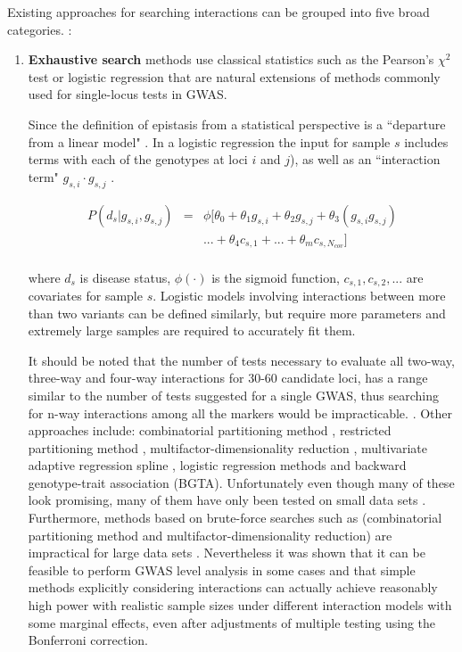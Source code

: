 Existing approaches for searching interactions can be grouped into five broad categories. \cite{li2011detecting}:
\begin{enumerate}
	\item \textbf{Exhaustive search} methods use classical statistics such as the Pearson's $\chi^2$ test or logistic regression that are natural extensions of methods commonly used for single-locus tests in GWAS.
	
Since the definition of epistasis from a statistical perspective is a ``departure from a linear model" \cite{cordell2009detecting}. 
In a logistic regression the input for sample $s$ includes terms with each of the genotypes at loci $i$ and $j$), as well as an ``interaction term" $g_{s,i} \cdot g_{s,j}$ \cite{cordell2002epistasis}. 

\begin{eqnarray*} \label{eq:gwasLogRegH1}
    P( d_s | g_{s,i},g_{s,j}) & = & \phi[ \theta_0 + \theta_1 g_{s,i} + \theta_2 g_{s,j} + \theta_3 (g_{s,i} g_{s,j}) \\
    & & ... + \theta_4 c_{s,1} + ... + \theta_m c_{s,N_{cov}} ] \\
\end{eqnarray*}

where $d_s$ is disease status, $\phi(\cdot)$ is the sigmoid function, $c_{s,1}, c_{s,2}, ... $ are covariates for sample $s$.
Logistic models involving interactions between more than two variants can be defined similarly, but require more parameters and extremely large samples are required to accurately fit them.

It should be noted that the number of tests necessary to evaluate all two-way, three-way and four-way interactions for 30-60 candidate loci, has a range similar to the number of tests suggested for a single GWAS, thus searching for n-way interactions among all the markers would be impracticable. \cite{culverhouse2002perspective}.
Other approaches include: combinatorial partitioning method \cite{REF}, restricted partitioning method \cite{REF}, multifactor-dimensionality reduction \cite{REF}, multivariate adaptive regression spline \cite{REF}, logistic regression methods and backward genotype-trait association (BGTA)\cite{REF}. 
Unfortunately even though many of these look promising, many of them have only been tested on small data sets \cite{zhang2007bayesian}.
Furthermore, methods based on brute-force searches such as (combinatorial partitioning method and multifactor-dimensionality reduction) are impractical for large data sets \cite{zhang2007bayesian}.
Nevertheless it was shown \cite{li2011detecting} that it can be feasible to perform GWAS level analysis in some cases and that simple methods explicitly considering interactions can actually achieve reasonably high power with realistic sample sizes under different interaction models with some marginal effects, even after adjustments of multiple testing using the Bonferroni correction.
	

\end{enumerate}
